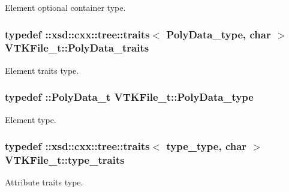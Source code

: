 Element optional container type. 

\hypertarget{classVTKFile__t_aa5ad98f5709c1e9beec3804a7f42b5f6}{}
\subsubsection[{Poly\+Data\+\_\+traits}]{\setlength{\rightskip}{0pt plus 5cm}typedef \+::xsd\+::cxx\+::tree\+::traits$<$ {\bf Poly\+Data\+\_\+type}, char $>$ {\bf V\+T\+K\+File\+\_\+t\+::\+Poly\+Data\+\_\+traits}}\label{classVTKFile__t_aa5ad98f5709c1e9beec3804a7f42b5f6}


Element traits type. 

\hypertarget{classVTKFile__t_a4588b4f0e28ba09aa219bda7e1fc6c97}{}
\subsubsection[{Poly\+Data\+\_\+type}]{\setlength{\rightskip}{0pt plus 5cm}typedef \+::{\bf Poly\+Data\+\_\+t} {\bf V\+T\+K\+File\+\_\+t\+::\+Poly\+Data\+\_\+type}}\label{classVTKFile__t_a4588b4f0e28ba09aa219bda7e1fc6c97}


Element type. 

\hypertarget{classVTKFile__t_aee4ac167e843e9def1be4f43ad930391}{}
\subsubsection[{type\+\_\+traits}]{\setlength{\rightskip}{0pt plus 5cm}typedef \+::xsd\+::cxx\+::tree\+::traits$<$ {\bf type\+\_\+type}, char $>$ {\bf V\+T\+K\+File\+\_\+t\+::type\+\_\+traits}}\label{classVTKFile__t_aee4ac167e843e9def1be4f43ad930391}


Attribute traits type. 

\hypertarget{classVTKFile__t_ac1f3484e4fde414849ede43a00955f76}{}
